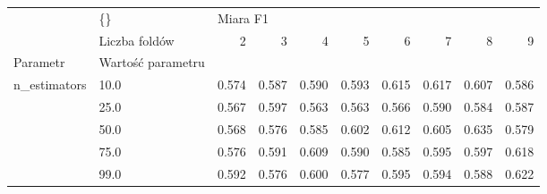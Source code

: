 \begin{tabular}{llrrrrrrrr}
\hline
             & \{\} & \multicolumn{8}{l}{Miara F1} \\
             & Liczba foldów &        2 &      3 &      4 &      5 &      6 &      7 &      8 &      9 \\
Parametr & Wartość parametru &          &        &        &        &        &        &        &        \\
\hline
n\_estimators & 10.0 &    0.574 &  0.587 &  0.590 &  0.593 &  0.615 &  0.617 &  0.607 &  0.586 \\
             & 25.0 &    0.567 &  0.597 &  0.563 &  0.563 &  0.566 &  0.590 &  0.584 &  0.587 \\
             & 50.0 &    0.568 &  0.576 &  0.585 &  0.602 &  0.612 &  0.605 &  0.635 &  0.579 \\
             & 75.0 &    0.576 &  0.591 &  0.609 &  0.590 &  0.585 &  0.595 &  0.597 &  0.618 \\
             & 99.0 &    0.592 &  0.576 &  0.600 &  0.577 &  0.595 &  0.594 &  0.588 &  0.622 \\
\hline
\end{tabular}
